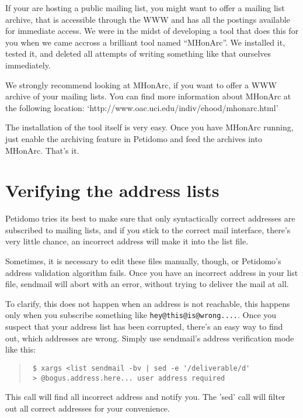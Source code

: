 \documentclass[a4paper,11pt]{scrreprt}
\newcommand{\file}[1]{{\textsf{#1}}}
\begin{document}
If your are hosting a public mailing list, you might want to offer a
mailing list archive, that is accessible through the WWW and has all
the postings available for immediate access. We were in the midst of
developing a tool that does this for you when we came accross a
brilliant tool named ``MHonArc''. We installed it, tested it, and
deleted all attempts of writing something like that ourselves
immediately.

We strongly recommend looking at MHonArc, if you want to offer a WWW
archive of your mailing lists. You can find more information about
MHonArc at the following location:
`http://www.oac.uci.edu/indiv/ehood/mhonarc.html'

The installation of the tool itself is very easy. Once you have
MHonArc running, just enable the archiving feature in Petidomo and
feed the archives into MHonArc. That's it.

\section{Verifying the address lists}

Petidomo tries its best to make sure that only syntactically correct
addresses are subscribed to mailing lists, and if you stick to the
correct mail interface, there's very little chance, an incorrect
address will make it into the \file{list} file.

Sometimes, it is necessary to edit these files manually, though, or
Petidomo's address validation algorithm fails. Once you have an
incorrect address in your list file, sendmail will abort with an
error, without trying to deliver the mail at all.

To clarify, this does not happen when an address is not reachable, this happens
only when you subscribe something like {\texttt{hey@this@is@wrong....}}. Once
you suspect that your address list has been corrupted, there's an easy way to
find out, which addresses are wrong. Simply use sendmail's address verification
mode like this:

\begin{quote}
\begin{verbatim}
 $ xargs <list sendmail -bv | sed -e '/deliverable/d'
 > @bogus.address.here... user address required
\end{verbatim}
\end{quote}

This call will find all incorrect address and notify you. The 'sed'
call will filter out all correct addresses for your convenience.
\end{document}
